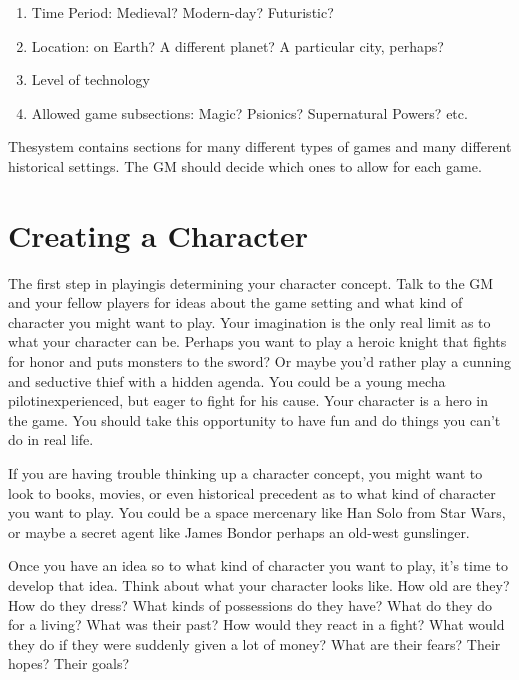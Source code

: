 \documentclass[twoside]{book}
\begin{document}
\begin{enumerate}
      
  \item 
    {  
    Time Period: Medieval? Modern-day? Futuristic?
    }
  
  \item 
    {  
    Location: on Earth? A different planet? A particular city, perhaps?
    }
  
  \item 
    {  
    Level of technology
    }
  
  \item 
    {  
    Allowed game subsections: Magic? Psionics? Supernatural Powers? etc.
    }
  
\end{enumerate}
  
    {  
    The\APATHY{}system contains sections for many different types of games and many different historical settings. The GM should decide which ones to allow for each game.
    }
  
    

\section{Creating a Character}
    
    {  
    The first step in playing\APATHY{}is determining your character concept. Talk to the GM and your fellow players for ideas about the game setting and what kind of character you might want to play. Your imagination is the only real limit as to what your character can be. Perhaps you want to play a heroic knight that fights for honor and puts monsters to the sword? Or maybe you'd rather play a cunning and seductive thief with a hidden agenda. You could be a young mecha pilotinexperienced, but eager to fight for his cause. Your character is a hero in the game. You should take this opportunity to have fun and do things you can't do in real life.
    }
  
    {  
    If you are having trouble thinking up a character concept, you might want to look to books, movies, or even historical precedent as to what kind of character you want to play. You could be a space mercenary like Han Solo from Star Wars, or maybe a secret agent like James Bondor perhaps an old-west gunslinger.
    }
  
    {  
    Once you have an idea so to what kind of character you want to play, it's time to develop that idea. Think about what your character looks like. How old are they? How do they dress? What kinds of possessions do they have? What do they do for a living? What was their past? How would they react in a fight? What would they do if they were suddenly given a lot of money? What are their fears? Their hopes? Their goals?
    }
  
\end{document}
